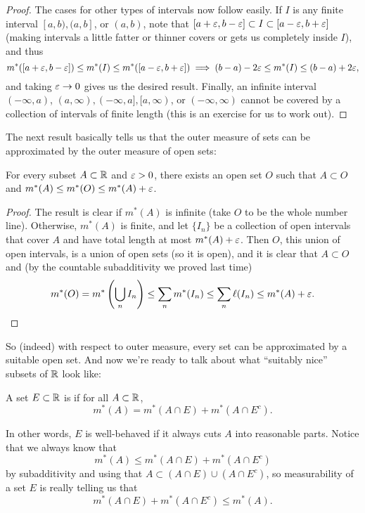 \begin{proof}
The cases for other types of intervals now follow easily. If $I$ is any finite interval $[a, b), (a, b]$, or $(a, b)$, note that $[a + \varepsilon, b - \varepsilon] \subset I \subset [a - \varepsilon, b + \varepsilon]$ (making intervals a little fatter or thinner covers or gets us completely inside $I$), and thus 
\[
    m^\ast([a + \varepsilon, b - \varepsilon]) \le m^\ast(I) \le m^\ast([a - \varepsilon, b + \varepsilon]) \implies (b-a) - 2\varepsilon \le m^\ast(I) \le (b-a) + 2\varepsilon,
\]
and taking $\varepsilon \to 0$ gives us the desired result. Finally, an infinite interval $(-\infty, a)$, $(a, \infty), (-\infty, a], [a, \infty)$, or $(-\infty, \infty)$ cannot be covered by a collection of intervals of finite length (this is an exercise for us to work out). 
\end{proof}

The next result basically tells us that the outer measure of sets can be approximated by the outer measure of open sets:

\begin{theorem}
For every subset $A \subset \mathbb R$ and $\varepsilon > 0$, there exists an open set $O$ such that $A \subset O$ and $m^\ast(A) \le m^\ast(O) \le m^\ast(A) + \varepsilon$.
\end{theorem}
\begin{proof}
The result is clear if $m^\ast(A)$ is infinite (take $O$ to be the whole number line). Otherwise, $m^\ast(A)$ is finite, and let $\{I_n\}$ be a collection of open intervals that cover $A$ and have total length at most $m^\ast(A) + \varepsilon$. Then $O$, this union of open intervals, is a union of open sets (so it is open), and it is clear that $A \subset O$ and (by the countable subadditivity we proved last time) 
\[
    m^\ast(O) = m^\ast\left(\bigcup_n I_n\right) \le \sum_n m^\ast(I_n) \le \sum_n \ell(I_n) \le m^\ast(A) + \varepsilon.
\]
\end{proof}

So (indeed) with respect to outer measure, every set can be approximated by a suitable open set. And now we're ready to talk about what ``suitably nice'' subsets of $\mathbb R$ look like:

\begin{definition}
A set $E \subset \mathbb R$ is  if for all $A \subset \mathbb R$, 
\[
    m^\ast(A) = m^\ast(A \cap E) + m^\ast(A \cap E^c).
\]
\end{definition}

In other words, $E$ is well-behaved if it always cuts $A$ into reasonable parts. Notice that we always know that
\[
    m^\ast(A) \le m^\ast(A \cap E) + m^\ast(A \cap E^c)
\]
by subadditivity and using that $A \subset (A \cap E) \cup (A \cap E^c)$, so measurability of a set $E$ is really telling us that \[
    m^\ast(A \cap E) + m^\ast(A \cap E^c) \le m^\ast(A).
\]

